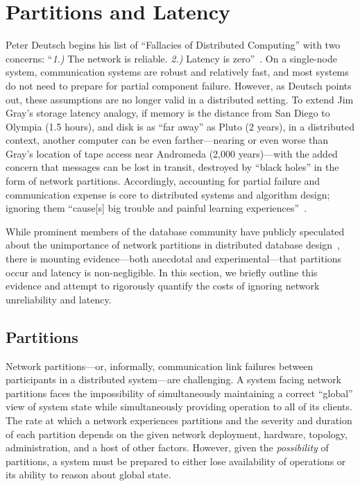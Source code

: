 
\section{Partitions and Latency}

Peter Deutsch begins his list of ``Fallacies of Distributed
Computing'' with two concerns: ``\textit{1.)}  The network is
reliable. \textit{2.)} Latency is zero''~\cite{fallacies-deutsch}. On
a single-node system, communication systems are robust and relatively
fast, and most systems do not need to prepare for partial component
failure. However, as Deutsch points out, these assumptions are no
longer valid in a distributed setting. To extend Jim Gray's storage
latency analogy, if memory is the distance from San Diego to Olympia
(1.5 hours), and disk is as ``far away'' as Pluto (2 years), in a
distributed context, another computer can be even farther---nearing or
even worse than Gray's location of tape access near Andromeda (2,000
years)---with the added concern that messages can be lost in transit,
destroyed by ``black holes'' in the form of network
partitions. Accordingly, accounting for partial failure and
communication expense is core to distributed systems and algorithm
design; ignoring them ``cause[s] big trouble and painful learning
experiences''~\cite{fallacies-deutsch}.

While prominent members of the database community have publicly
speculated about the unimportance of network partitions in distributed
database design~\cite{stonebraker2010errors}, there is mounting
evidence---both anecdotal and experimental---that partitions occur and
latency is non-negligible. In this section, we briefly outline this
evidence and attempt to rigorously quantify the costs of ignoring
network unreliability and latency.

\subsection{Partitions}

Network partitions---or, informally, communication link failures
between participants in a distributed system---are challenging. A
system facing network partitions faces the impossibility of
simultaneously maintaining a correct ``global'' view of system state
while simultaneously providing operation to all of its clients. The
rate at which a network experiences partitions and the severity and
duration of each partition depends on the given network deployment,
hardware, topology, administration, and a host of other
factors. However, given the \textit{possibility} of partitions, a
system must be prepared to either lose availability of operations or
its ability to reason about global state.

